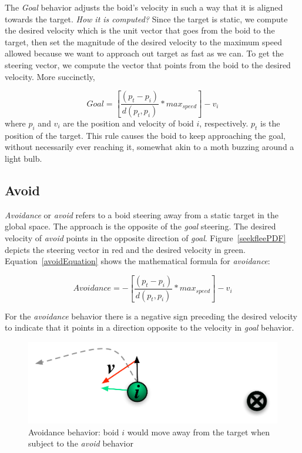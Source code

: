 The \textit{Goal} behavior adjusts the boid's velocity in such a way that it is aligned towards the target. \textit{How it is computed?} Since the target is static, we compute the desired velocity which is the unit vector that goes from the boid to the target, then set the magnitude of the desired velocity to the maximum speed allowed because we want to approach out target as fast as we can. To get the steering vector, we compute the vector that points from the boid to the desired velocity. More succinctly, 

\begin{equation}
\label{goalEquation}
Goal = \left[\frac{(p_t - p_i)}{d(p_t,p_i)} * max_{speed} \right] - v_i
\end{equation}
where $p_i$ and $v_i$ are the position and velocity of boid $i$, respectively. $p_t$ is the position of the target. This rule causes the boid to keep approaching the goal, without necessarily ever reaching it, somewhat akin to a moth buzzing around a light bulb.

\subsection{Avoid}
\textit{Avoidance} or \textit{avoid} refers to a boid steering away from a static target in the global space. The approach is the opposite of the \textit{goal} steering. The desired velocity of \textit{avoid} points in the opposite direction of \textit{goal}. Figure~\ref{seekfleePDF} depicts the steering vector in red and the desired velocity in green. Equation~\ref{avoidEquation} shows the mathematical formula for \textit{avoidance}:

\begin{equation}
\label{avoidEquation}
Avoidance = -\left[\frac{(p_t - p_i)}{d(p_t,p_i)} * max_{speed} \right] - v_i
\end{equation}

For the \textit{avoidance} behavior there is a negative sign preceding the desired velocity to indicate that it points in a direction opposite to the velocity in \textit{goal} behavior.

\begin{figure}[htbp]
\begin{center}
\includegraphics[scale=0.75]{figures/avoidance.pdf}
\caption{Avoidance behavior: boid $i$ would move away from the target when subject to the \textit{avoid} behavior}
\label{goalPDF}
\end{center}
\end{figure}

